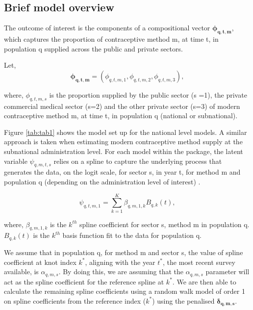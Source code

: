\subsection{Brief model overview}\label{brief-model-overview}

The outcome of interest is the components of a compositional vector \(\boldsymbol{{\phi_{q,t,m}}}\), which captures the proportion of contraceptive method m, at time t, in population q supplied across the public and private sectors.

Let,
\begin{equation}
\boldsymbol{{\phi_{q,t,m}}} =(\phi_{q,t,m,1},\phi_{q,t,m,2},\phi_{q,t,m,3}),
   \label{eq:eq1}
\end{equation}

where, \newline
\(\phi_{q,t,m,s}\) is the proportion supplied by the public sector (s =1), the private commercial medical sector (s=2) and the other private sector (s=3) of modern contraceptive method m, at time t, in population q (national or subnational). \newline 

Figure \ref{tab:tab1} shows the model set up for the national level models. A similar approach is taken when estimating modern contraceptive method supply at the subnational administration level. For each model within the  package, the latent variable \(\psi_{q,m,t,s}\) relies on a spline to capture the underlying process that generates the data, on the logit scale, for sector s, in year t, for method m and population q (depending on the administration level of interest) .

\begin{equation}
   \psi_{q,t,m,1}=\sum_{k=1}^K \beta_{q,m,1,k} B_{q,k}(t),
   \label{eq:eq2}
\end{equation}

where, \newline
\(\beta_{q,m,1,k}\) is the \(k^{th}\) spline coefficient for sector s, method m in population q. \newline
\(B_{q,k}(t)\) is the \(k^{th}\) basis function fit to the data for population q. \newline

We assume that in population q, for method m and sector s, the value of spline coefficient at knot index \(k^*\), aligning with the year \(t^*\), the most recent survey available, is \(\alpha_{q, m, s}\). By doing this, we are assuming that the \(\alpha_{q,m,s}\) parameter will act as the spline coefficient for the reference spline at \(k^*\). We are then able to calculate the remaining spline coefficients using a random walk model of order 1 on spline coefficients from the reference index (\(k^*\)) using the penalised \(\boldsymbol{\delta_{q,m,s}}\).

